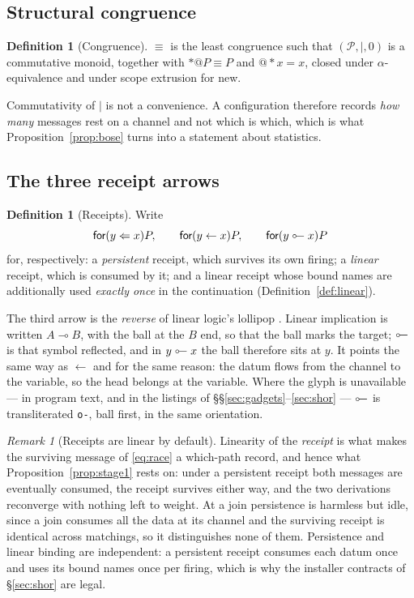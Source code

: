 \documentclass[11pt,a4paper]{article}
\theoremstyle{plain}
\theoremstyle{definition}
\newtheorem{definition}[theorem]{Definition}
\theoremstyle{remark}
\newtheorem{remark}[theorem]{Remark}
\newcommand{\Proc}{\mathcal{P}}
\newcommand{\scong}{\equiv}
\newcommand{\lolli}{\mathrel{\reflectbox{$\multimap$}}}
\begin{document}
\subsection{Structural congruence}

\begin{definition}[Congruence]\label{def:cong}
$\scong$ is the least congruence such that $(\Proc, \mid, 0)$ is a commutative
monoid, together with $*@P \scong P$ and $@{*}x = x$, closed under
$\alpha$-equivalence and under scope extrusion for \textsf{new}.
\end{definition}

Commutativity of $\mid$ is not a convenience. A configuration therefore records
\emph{how many} messages rest on a channel and not which is which, which is what
Proposition~\ref{prop:bose} turns into a statement about statistics.

\subsection{The three receipt arrows}

\begin{definition}[Receipts]\label{def:arrows}
Write
\[
  \textsf{for}(y \Leftarrow x)P, \qquad
  \textsf{for}(y \leftarrow x)P, \qquad
  \textsf{for}(y \lolli x)P
\]
for, respectively: a \emph{persistent} receipt, which survives its own firing; a
\emph{linear} receipt, which is consumed by it; and a linear receipt whose bound
names are additionally used \emph{exactly once} in the continuation
(Definition~\ref{def:linear}).

The third arrow is the \emph{reverse} of linear logic's lollipop
\cite{Girard}. Linear implication is written $A \multimap B$, with the ball at
the $B$ end, so that the ball marks the target; $\lolli$ is that symbol
reflected, and in $y \lolli x$ the ball therefore sits at $y$. It points the
same way as $\leftarrow$ and for the same reason: the datum flows from the
channel to the variable, so the head belongs at the variable. Where the glyph is
unavailable --- in program text, and in the listings of
\S\S\ref{sec:gadgets}--\ref{sec:shor} --- $\lolli$ is transliterated
\texttt{o-}, ball first, in the same orientation.
\end{definition}

\begin{remark}[Receipts are linear by default]\label{rem:linear}
Linearity of the \emph{receipt} is what makes the surviving message of
\eqref{eq:race} a which-path record, and hence what
Proposition~\ref{prop:stage1} rests on: under a persistent receipt both messages
are eventually consumed, the receipt survives either way, and the two
derivations reconverge with nothing left to weight. At a join persistence is
harmless but idle, since a join consumes all the data at its channel and the
surviving receipt is identical across matchings, so it distinguishes none of
them. Persistence and linear binding are independent: a persistent receipt
consumes each datum once and uses its bound names once per firing, which is why
the installer contracts of \S\ref{sec:shor} are legal.
\end{remark}
\end{document}
